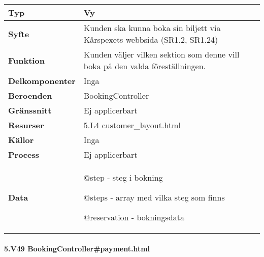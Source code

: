 \documentclass[a4paper, twoside, 11pt, titlepage]{article}
\begin{document}
			\begin {table} [ht] \begin{tabular} {  p{3.5cm} p{11.6cm} }
				\hline
				{\sffamily\textbf{Typ}} & {Vy} \\
				\hline
				{\sffamily\textbf{Syfte}} & {Kunden ska kunna boka sin biljett via Kårspexets webbsida (SR1.2, SR1.24)} \\
				\hline
				{\sffamily\textbf{Funktion}} & {Kunden väljer vilken sektion som denne vill boka på den valda föreställningen.} \\
				\hline
				{\sffamily\textbf{Delkomponenter}} & {Inga} \\
				\hline
				{\sffamily\textbf{Beroenden}} & {BookingController} \\
				\hline
				{\sffamily\textbf{Gränssnitt}} & {Ej applicerbart} \\
				\hline
				{\sffamily\textbf{Resurser}} & {5.L4 customer\_layout.html} \\
				\hline
				{\sffamily\textbf{Källor}} & {Inga} \\
				\hline
				{\sffamily\textbf{Process}} & {Ej applicerbart} \\
				\hline
				{\sffamily\textbf{Data}} & {@step - steg i bokning

@steps - array med vilka steg som finns

@reservation - bokningsdata} \\
				\hline
			\end{tabular} \end{table} \FloatBarrier


			\paragraph{5.V49 BookingController\#payment.html}\
\end{document}
